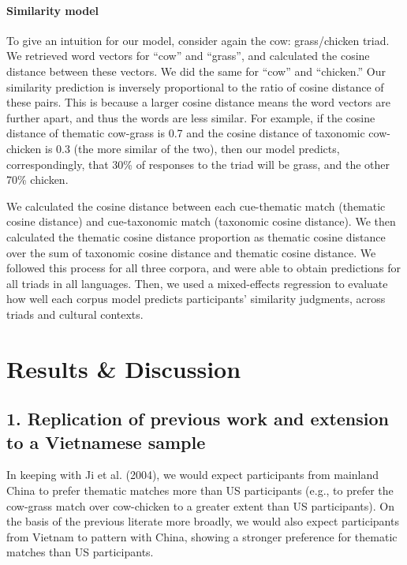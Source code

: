 \documentclass[10pt, letterpaper]{article}
\begin{document}
\hypertarget{similarity-model}{%
\paragraph{Similarity model}\label{similarity-model}}

To give an intuition for our model, consider again the cow:
grass/chicken triad. We retrieved word vectors for ``cow'' and
``grass'', and calculated the cosine distance between these vectors. We
did the same for ``cow'' and ``chicken.'' Our similarity prediction is
inversely proportional to the ratio of cosine distance of these pairs.
This is because a larger cosine distance means the word vectors are
further apart, and thus the words are less similar. For example, if the
cosine distance of thematic cow-grass is 0.7 and the cosine distance of
taxonomic cow-chicken is 0.3 (the more similar of the two), then our
model predicts, correspondingly, that 30\% of responses to the triad
will be grass, and the other 70\% chicken.

We calculated the cosine distance between each cue-thematic match
(thematic cosine distance) and cue-taxonomic match (taxonomic cosine
distance). We then calculated the thematic cosine distance proportion as
thematic cosine distance over the sum of taxonomic cosine distance and
thematic cosine distance. We followed this process for all three
corpora, and were able to obtain predictions for all triads in all
languages. Then, we used a mixed-effects regression to evaluate how well
each corpus model predicts participants' similarity judgments, across
triads and cultural contexts.

\hypertarget{results-discussion}{%
\section{Results \& Discussion}\label{results-discussion}}

\hypertarget{replication-of-previous-work-and-extension-to-a-vietnamese-sample}{%
\subsection{1. Replication of previous work and extension to a
Vietnamese
sample}\label{replication-of-previous-work-and-extension-to-a-vietnamese-sample}}

In keeping with Ji et al. (2004), we would expect participants from
mainland China to prefer thematic matches more than US participants
(e.g., to prefer the cow-grass match over cow-chicken to a greater
extent than US participants). On the basis of the previous literate more
broadly, we would also expect participants from Vietnam to pattern with
China, showing a stronger preference for thematic matches than US
participants.
\end{document}
